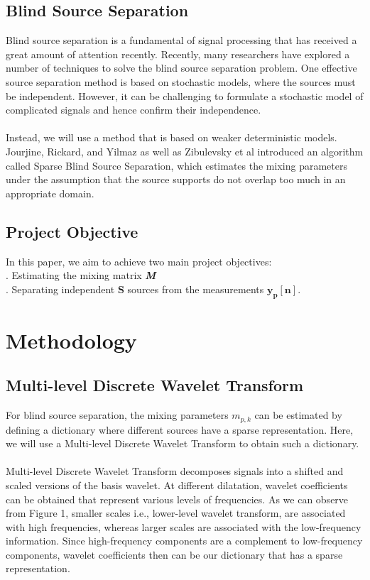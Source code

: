 \documentclass[a4paper,11pt]{article}
\begin{document}
\subsection{Blind Source Separation}
Blind source separation is a fundamental of signal processing that has received a great amount of attention recently. Recently, many researchers have explored a number of techniques to solve the blind source separation problem\cite{1576973}\cite{ica}\cite{6025435}. One effective source separation method is based on stochastic models, where the sources must be independent\cite{COMON1994287}. However, it can be challenging to formulate a stochastic model of complicated signals and hence confirm their independence. \\
\\
\noindent Instead, we will use a method that is based on weaker deterministic models.
Jourjine, Rickard, and Yilmaz as well as Zibulevsky et al introduced an algorithm called Sparse Blind Source Separation, which estimates the mixing parameters under the assumption that the source supports do not overlap too much in an appropriate domain.\cite{1461442}\cite{BOFILL20012353}



\subsection{Project Objective}
In this paper, we aim to achieve two main project objectives:\\
. Estimating the mixing matrix \textbf{\textit{M}} \\
. Separating independent $\boldsymbol{S}$ sources from the measurements $\boldsymbol{y_p[n]}$. 



\section{Methodology}

\subsection{Multi-level Discrete Wavelet Transform}
For blind source separation, the mixing parameters $m_{p,k}$ can be estimated by defining a dictionary where different sources have a sparse representation. Here, we will use a Multi-level Discrete Wavelet Transform to obtain such a dictionary.\\
\\
Multi-level Discrete Wavelet Transform decomposes signals into a shifted and scaled versions of the basis wavelet. At different dilatation, wavelet coefficients can be obtained that represent various levels of frequencies. As we can observe from Figure 1, smaller scales i.e., lower-level wavelet transform, are associated with high frequencies, whereas larger scales are associated with the low-frequency information. Since high-frequency components are a complement to low-frequency components, wavelet coefficients then can be our dictionary that has a sparse representation.
\end{document}
